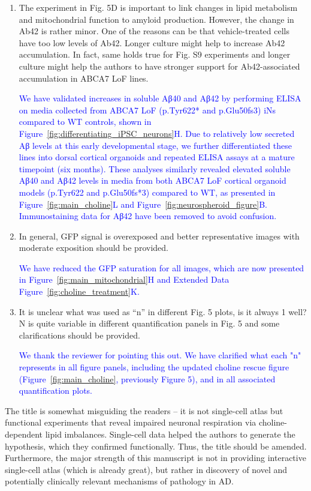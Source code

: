 \begin{enumerate}
	\item The experiment in Fig. 5D is important to link changes in lipid metabolism and mitochondrial function to amyloid production. However, the change in Ab42 is rather minor. One of the reasons can be that vehicle-treated cells have too low levels of Ab42. Longer culture might help to increase Ab42 accumulation. In fact, same holds true for Fig. S9 experiments and longer culture might help the authors to have stronger support for Ab42-associated accumulation in ABCA7 LoF lines.
	
	\textcolor{blue}{We have validated increases in soluble Aβ40 and Aβ42 by performing ELISA on media collected from ABCA7 LoF (p.Tyr622* and p.Glu50fs3) iNs compared to WT controls, shown in Figure~\ref{fig:differentiating_iPSC_neurons}H. Due to relatively low secreted Aβ levels at this early developmental stage, we further differentiated these lines into dorsal cortical organoids and repeated ELISA assays at a mature timepoint (six months). These analyses similarly revealed elevated soluble Aβ40 and Aβ42 levels in media from both ABCA7 LoF cortical organoid models (p.Tyr622 and p.Glu50fs*3) compared to WT, as presented in Figure~\ref{fig:main_choline}L and Figure~\ref{fig:neurospheroid_figure}B. Immunostaining data for Aβ42 have been removed to avoid confusion.}

	\item In general, GFP signal is overexposed and better representative images with moderate exposition should be provided.
	
	\textcolor{blue}{We have reduced the GFP saturation for all images, which are now presented in Figure~\ref{fig:main_mitochondrial}H and Extended Data Figure~\ref{fig:choline_treatment}K.} 

	\item It is unclear what was used as “n” in different Fig. 5 plots, is it always 1 well? N is quite variable in different quantification panels in Fig. 5 and some clarifications should be provided.
	
	\textcolor{blue}{We thank the reviewer for pointing this out. We have clarified what each "n" represents in all figure panels, including the updated choline rescue figure (Figure~\ref{fig:main_choline}, previously Figure 5), and in all associated quantification plots.}

\end{enumerate}

The title is somewhat misguiding the readers – it is not single-cell atlas but functional experiments that reveal impaired neuronal respiration via choline-dependent lipid imbalances. Single-cell data helped the authors to generate the hypothesis, which they confirmed functionally. Thus, the title should be amended. Furthermore, the major strength of this manuscript is not in providing interactive single-cell atlas (which is already great), but rather in discovery of novel and potentially clinically relevant mechanisms of pathology in AD.

